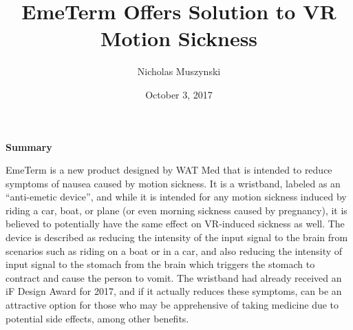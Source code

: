 \documentclass{article}
\begin{document}
\title{EmeTerm Offers Solution to VR Motion Sickness }
\author{Nicholas Muszynski}
\date{October 3, 2017}

\maketitle

\textbf{Summary}
\newline

EmeTerm is a new product designed by WAT Med that is intended to reduce symptoms of nausea caused by motion sickness. It is a wristband, labeled as an "`anti-emetic device"', and while it is intended for any motion sickness induced by riding a car, boat, or plane (or even morning sickness caused by pregnancy), it is believed to potentially have the same effect on VR-induced sickness as well. The device is described as reducing the intensity of the input signal to the brain from scenarios such as riding on a boat or in a car, and also reducing the intensity of input signal to the stomach from the brain which triggers the stomach to contract and cause the person to vomit. The wristband had already received an iF Design Award for 2017, and if it actually reduces these symptoms, can be an attractive option for those who may be apprehensive of taking medicine due to potential side effects, among other benefits.

\nocite{article2cite}



\end{document}
